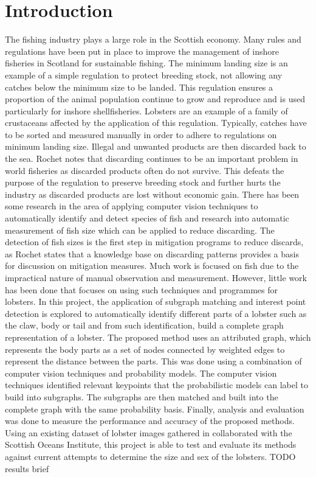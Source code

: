 
\section{Introduction}

The fishing industry plays a large role in the Scottish economy. Many rules and regulations have been put in place to improve the management of inshore fisheries in Scotland for sustainable fishing. The minimum landing size is an example of a simple regulation to protect breeding stock, not allowing any catches below the minimum size to be landed. This regulation ensures a proportion of the animal population continue to grow and reproduce \cite{masts-report} and is used particularly for inshore shellfisheries. Lobsters are an example of a family of crustaceans affected by the application of this regulation. 
\n
Typically, catches have to be sorted and measured manually in order to adhere to regulations on minimum landing size. Illegal and unwanted products are then discarded back to the sea. Rochet \cite{discard} notes that discarding continues to be an important problem in world fisheries as discarded products often do not survive. This defeats the purpose of the regulation to preserve breeding stock and further hurts the industry as discarded products are lost without economic gain. 
\n
There has been some research in the area of applying computer vision techniques to automatically identify and detect species of fish \cite{iobserver, fish-detection, fish-classification} and research into automatic measurement of fish size \cite{fish-size, fish-size2} which can be applied to reduce discarding. The detection of fish sizes is the first step in mitigation programs \cite{discard} to reduce discards, as Rochet states that a knowledge base on discarding patterns provides a basis for discussion on mitigation measures. Much work is focused on fish due to the impractical nature of manual observation and measurement. However, little work has been done that focuses on using such techniques and programmes for lobsters. 
\n
In this project, the application of subgraph matching and interest point detection is explored to automatically identify different parts of a lobster such as the claw, body or tail and from such identification, build a complete graph representation of a lobster. The proposed method uses an attributed graph, which represents the body parts as a set of nodes connected by weighted edges to represent the distance between the parts. This was done using a combination of computer vision techniques and probability models. The computer vision techniques identified relevant keypoints that the probabilistic models can label to build into subgraphs. The subgraphs are then matched and built into the complete graph with the same probability basis. Finally, analysis and evaluation was done to measure the performance and accuracy of the proposed methods. Using an existing dataset of lobster images gathered in collaborated with the Scottish Oceans Institute, this project is able to test and evaluate its methods against current attempts to determine the size and sex of the lobsters. TODO results brief

